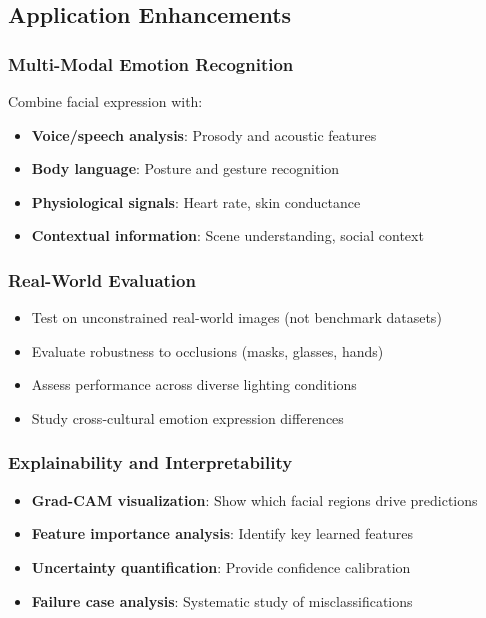 \documentclass[12pt,a4paper]{article}
\begin{document}
\subsection{Application Enhancements}

\subsubsection{Multi-Modal Emotion Recognition}
Combine facial expression with:
\begin{itemize}[leftmargin=*]
    \item \textbf{Voice/speech analysis}: Prosody and acoustic features
    \item \textbf{Body language}: Posture and gesture recognition
    \item \textbf{Physiological signals}: Heart rate, skin conductance
    \item \textbf{Contextual information}: Scene understanding, social context
\end{itemize}

\subsubsection{Real-World Evaluation}
\begin{itemize}[leftmargin=*]
    \item Test on unconstrained real-world images (not benchmark datasets)
    \item Evaluate robustness to occlusions (masks, glasses, hands)
    \item Assess performance across diverse lighting conditions
    \item Study cross-cultural emotion expression differences
\end{itemize}

\subsubsection{Explainability and Interpretability}
\begin{itemize}[leftmargin=*]
    \item \textbf{Grad-CAM visualization}: Show which facial regions drive predictions
    \item \textbf{Feature importance analysis}: Identify key learned features
    \item \textbf{Uncertainty quantification}: Provide confidence calibration
    \item \textbf{Failure case analysis}: Systematic study of misclassifications
\end{itemize}
\end{document}
